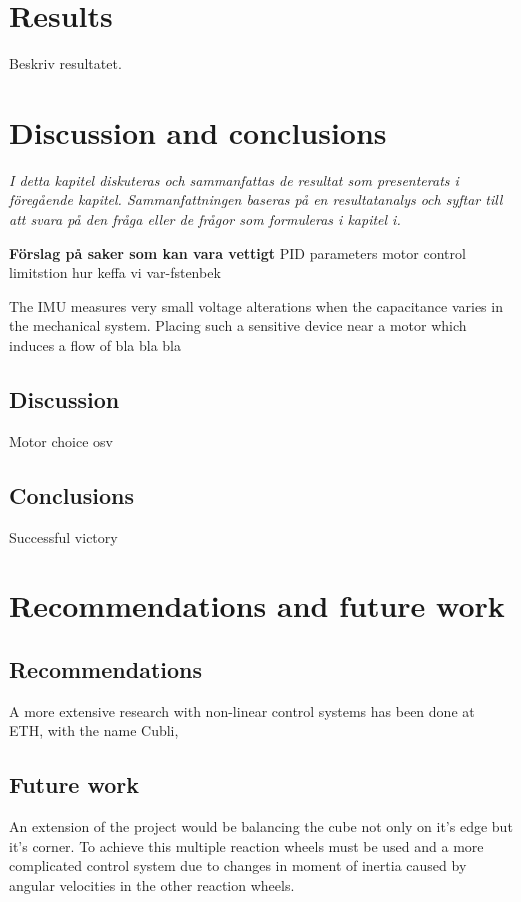 \documentclass[a4paper,11pt]{kth-mag}
\begin{document}
\chapter{Results}
Beskriv resultatet. 

\chapter{Discussion and conclusions}
\emph{I detta kapitel diskuteras och sammanfattas de resultat som presenterats i föregående kapitel. Sammanfattningen baseras på en resultatanalys och syftar till att svara på den fråga eller de frågor som formuleras i kapitel i.}

\textbf{Förslag på saker som kan vara vettigt}
PID parameters
motor control limitstion
hur keffa vi var-fstenbek

The IMU measures very small voltage alterations when the capacitance varies in the mechanical system. Placing such a sensitive device near a motor which induces a flow of bla bla bla

\section{Discussion}
Motor choice osv

\section{Conclusions}
Successful victory


\chapter{Recommendations and future work}

\section{Recommendations}
A more extensive research with non-linear control systems has been done at ETH, with the name Cubli,\cite{cubliECC13}

\section{Future work}
An extension of the project would be balancing the cube not only on it's edge but it's corner. To achieve this multiple reaction wheels must be used and a more complicated control system due to changes in moment of inertia caused by angular velocities in the other reaction wheels.
\end{document}
